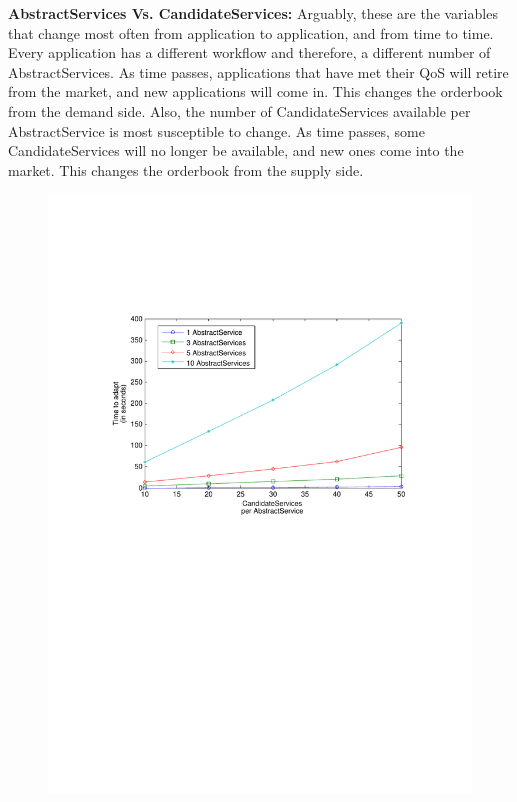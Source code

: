 \documentclass[10pt,journal,compsoc]{IEEEtran}
\begin{document}
\textbf{AbstractServices Vs. CandidateServices:}
Arguably, these are the variables that change most often from application to application, and from time to time. Every application has a different workflow and therefore, a different number of AbstractServices. As time passes, applications that have met their QoS will retire from the market, and new applications will come in. This changes the orderbook from the demand side. Also, the number of CandidateServices available per AbstractService is most susceptible to change. As time passes, some CandidateServices will no longer be available, and new ones come into the market. This changes the orderbook from the supply side.

\begin{figure}[htbp]
	\begin{minipage}[b]{0.4\linewidth}
	\hspace{0.5cm}
	\includegraphics[clip, trim=5cm 14cm 2cm 6cm, scale=0.3]{graphs/1_3_5_10_task_per_svc_scaling.pdf}

\end{minipage}
\end{figure}
\end{document}
